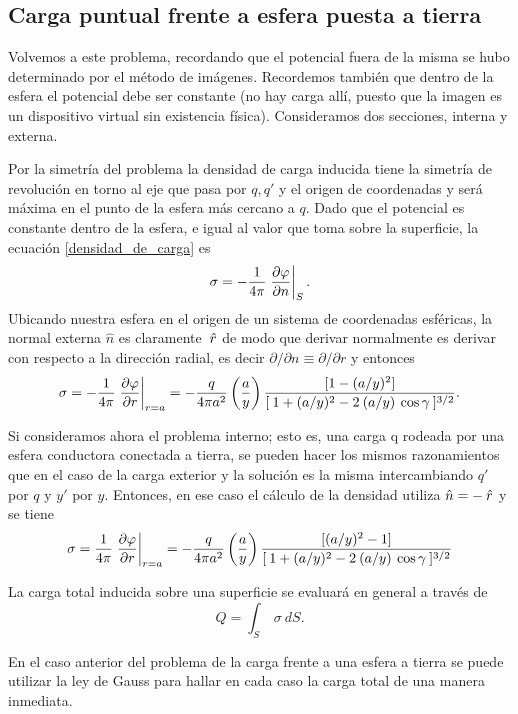 \documentclass[10pt,oneside]{CBFT_book}
\begin{document}
\subsection{Carga puntual frente a esfera puesta a tierra}

Volvemos a este problema, recordando que el potencial fuera de la misma se hubo determinado por el método
de imágenes. Recordemos también que dentro de la esfera el potencial debe ser constante (no hay carga allí,
puesto que la imagen es un dispositivo virtual sin existencia física).
Consideramos dos secciones, interna y externa.

Por la simetría del problema la densidad de carga inducida tiene la simetría de revolución en torno al 
eje que pasa por $q, q'$ y el origen de coordenadas y será máxima en el punto de la esfera más cercano a
$q$.
Dado que el potencial es constante dentro de la esfera, e igual al valor que toma sobre la superficie, la
ecuación \eqref{densidad_de_carga} es 
\[
	\sigma = - \frac{1}{4\pi} \left.\frac{\partial^{\hspace{-0.05em}} {\varphi}}{\partial {n}^{\hspace{-0.05em}}}\right|_S.
\]
Ubicando nuestra esfera en el origen de un sistema de coordenadas esféricas, la normal externa $\hat{n}$
es claramente $\:\hat{r}$ de modo que derivar normalmente es derivar con respecto a la dirección radial, es 
decir $\partial / \partial n \equiv \partial / \partial r$ y entonces 
\[
	\sigma = - \frac{1}{4\pi} \left.\frac{\partial^{\hspace{-0.05em}} {\varphi}}{\partial {r}^{\hspace{-0.05em}}}\right|_{r=a} =
	- \frac{q}{4 \pi a^2} \left( \frac{ a }{ y } \right) 
	\frac{[ 1 - (a / y)^2 ]}{[\: 1 + (a / y)^2 - 2 \: (a/y) \: \cos \gamma \:]^{3/2}}.
\]

Si consideramos ahora el problema interno; esto es, una carga q rodeada por una esfera conductora conectada
a tierra, se pueden hacer los mismos razonamientos que en el caso de la carga exterior y la solución es la
misma intercambiando $q'$ por $q$ y $y'$ por $y$.
Entonces, en ese caso el cálculo de la densidad utiliza $\hat{n} = -\:\hat{r}$ y se tiene 
\[
	\sigma = \frac{1}{4\pi} \left.\frac{\partial^{\hspace{-0.05em}} {\varphi}}{\partial {r}^{\hspace{-0.05em}}}\right|_{r=a} =
	- \frac{q}{4 \pi a^2} \left( \frac{ a }{ y } \right) 
	\frac{[ (a / y)^2 - 1 ]}{[\: 1 + (a / y)^2 - 2 \: (a/y) \: \cos \gamma \:]^{3/2}}
\]

La carga total inducida sobre una superficie se evaluará en general a través de
\[
	Q = \int_S \: \sigma \: dS.
\]

En el caso anterior del problema de la carga frente a una esfera a tierra se puede utilizar la ley de Gauss
para hallar en cada caso la carga total de una manera inmediata.
\end{document}
